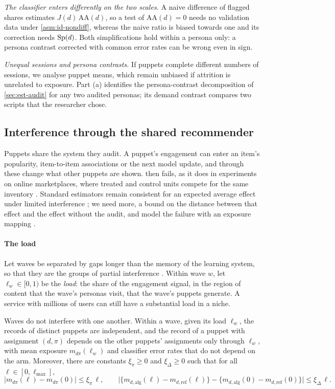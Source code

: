 \emph{The classifier enters differently on the two scales.} A naive difference of flagged shares estimates $J(d)\,\mathrm{AA}(d)$, so a test of $\mathrm{AA}(d)=0$ needs no validation data under \cref{asm:id-nondiff}, whereas the naive ratio is biased towards one and its correction needs $\mathrm{Sp}(d)$. Both simplifications hold within a persona only: a persona contrast corrected with common error rates can be wrong even in sign.

\emph{Unequal sessions and persona contrasts.} If puppets complete different numbers of sessions, we analyse puppet means, which remain unbiased if attrition is unrelated to exposure. Part (a) identifies the persona-contrast decomposition of \cref{sec:est-audit} for any two audited personas; its demand contrast compares two scripts that the researcher chose.

\subsection{Interference through the shared recommender}\label{sec:id-interference}

Puppets share the system they audit. A puppet's engagement can enter an item's popularity, item-to-item associations or the next model update, and through these change what other puppets are shown.  then fails, as it does in experiments on online marketplaces, where treated and control units compete for the same inventory \citep{johari2022,bajari2023}. Standard estimators remain consistent for an expected average effect under limited interference \citep{savje2021}; we need more, a bound on the distance between that effect and the effect without the audit, and model the failure with an exposure mapping \citep{aronow2017}.

\paragraph{The load}
Let waves be separated by gaps longer than the memory of the learning system, so that they are the groups of partial interference \citep{hudgens2008}. Within wave $w$, let $\ell_w\in[0,1)$ be the \emph{load}: the share of the engagement signal, in the region of content that the wave's personas visit, that the wave's puppets generate. A service with millions of users can still have a substantial load in a niche.

\begin{assumption}\label{asm:id-bounded}
Waves do not interfere with one another. Within a wave, given its load $\ell_w$, the records of distinct puppets are independent, and the record of a puppet with assignment $(d,\pi)$ depends on the other puppets' assignments only through $\ell_w$, with mean exposure $m_{d\pi}(\ell_w)$ and classifier error rates that do not depend on the arm. Moreover, there are constants $\xi_\pi\ge0$ and $\xi_\Delta\ge0$ such that for all $\ell\in[0,\ell_{\max}]$,
\[
  |m_{d\pi}(\ell)-m_{d\pi}(0)|\le\xi_\pi\,\ell,\qquad
  \bigl|\{m_{d,\mathrm{alg}}(\ell)-m_{d,\mathrm{ref}}(\ell)\}-\{m_{d,\mathrm{alg}}(0)-m_{d,\mathrm{ref}}(0)\}\bigr|\le\xi_\Delta\,\ell .
\]
\end{assumption}

